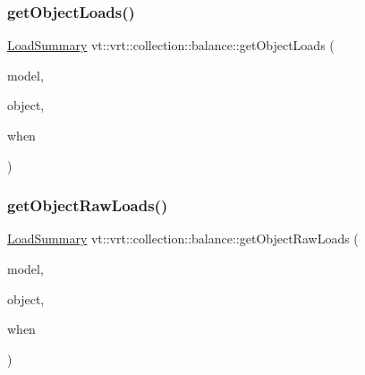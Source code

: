 \mbox{\label{namespacevt_1_1vrt_1_1collection_1_1balance_a5e4d4bdd2fceaebcb89d669b8a1b2361}} 
\subsubsection{\texorpdfstring{get\+Object\+Loads()}{getObjectLoads()}\hspace{0.1cm}{\footnotesize\ttfamily [2/2]}}
{\footnotesize\ttfamily \hyperlink{structvt_1_1vrt_1_1collection_1_1balance_1_1_load_summary}{Load\+Summary} vt\+::vrt\+::collection\+::balance\+::get\+Object\+Loads (\begin{DoxyParamCaption}\item[{\hyperlink{structvt_1_1vrt_1_1collection_1_1balance_1_1_load_model}{Load\+Model} $\ast$}]{model,  }\item[{\hyperlink{namespacevt_1_1vrt_1_1collection_1_1balance_a9f5b53fafb270212279a4757d2c4cd28}{Element\+I\+D\+Struct}}]{object,  }\item[{\hyperlink{structvt_1_1vrt_1_1collection_1_1balance_1_1_phase_offset}{Phase\+Offset}}]{when }\end{DoxyParamCaption})}

\mbox{\label{namespacevt_1_1vrt_1_1collection_1_1balance_a458d9ee80526c682a9ece08ec4073ec8}} 
\subsubsection{\texorpdfstring{get\+Object\+Raw\+Loads()}{getObjectRawLoads()}\hspace{0.1cm}{\footnotesize\ttfamily [1/2]}}
{\footnotesize\ttfamily \hyperlink{structvt_1_1vrt_1_1collection_1_1balance_1_1_load_summary}{Load\+Summary} vt\+::vrt\+::collection\+::balance\+::get\+Object\+Raw\+Loads (\begin{DoxyParamCaption}\item[{std\+::shared\+\_\+ptr$<$ \hyperlink{structvt_1_1vrt_1_1collection_1_1balance_1_1_load_model}{Load\+Model} $>$}]{model,  }\item[{\hyperlink{namespacevt_1_1vrt_1_1collection_1_1balance_a9f5b53fafb270212279a4757d2c4cd28}{Element\+I\+D\+Struct}}]{object,  }\item[{\hyperlink{structvt_1_1vrt_1_1collection_1_1balance_1_1_phase_offset}{Phase\+Offset}}]{when }\end{DoxyParamCaption})}

